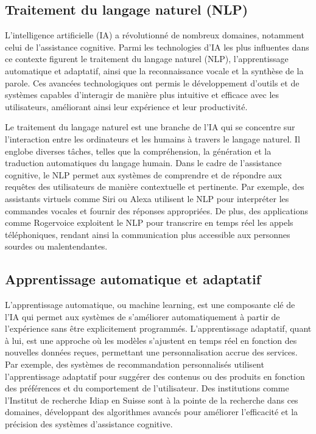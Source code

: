 \documentclass[12pt,a4paper]{report}
\begin{document}
\subsection{Traitement du langage naturel (NLP)}

L'intelligence artificielle (IA) a révolutionné de nombreux domaines, notamment celui de l'assistance cognitive. Parmi les technologies d'IA les plus influentes dans ce contexte figurent le traitement du langage naturel (NLP), l'apprentissage automatique et adaptatif, ainsi que la reconnaissance vocale et la synthèse de la parole. Ces avancées technologiques ont permis le développement d'outils et de systèmes capables d'interagir de manière plus intuitive et efficace avec les utilisateurs, améliorant ainsi leur expérience et leur productivité.

Le traitement du langage naturel est une branche de l'IA qui se concentre sur l'interaction entre les ordinateurs et les humains à travers le langage naturel. Il englobe diverses tâches, telles que la compréhension, la génération et la traduction automatiques du langage humain. Dans le cadre de l'assistance cognitive, le NLP permet aux systèmes de comprendre et de répondre aux requêtes des utilisateurs de manière contextuelle et pertinente. Par exemple, des assistants virtuels comme Siri ou Alexa utilisent le NLP pour interpréter les commandes vocales et fournir des réponses appropriées. De plus, des applications comme Rogervoice exploitent le NLP pour transcrire en temps réel les appels téléphoniques, rendant ainsi la communication plus accessible aux personnes sourdes ou malentendantes.

\subsection{Apprentissage automatique et adaptatif}

L'apprentissage automatique, ou machine learning, est une composante clé de l'IA qui permet aux systèmes de s'améliorer automatiquement à partir de l'expérience sans être explicitement programmés. L'apprentissage adaptatif, quant à lui, est une approche où les modèles s'ajustent en temps réel en fonction des nouvelles données reçues, permettant une personnalisation accrue des services. Par exemple, des systèmes de recommandation personnalisés utilisent l'apprentissage adaptatif pour suggérer des contenus ou des produits en fonction des préférences et du comportement de l'utilisateur. Des institutions comme l'Institut de recherche Idiap en Suisse sont à la pointe de la recherche dans ces domaines, développant des algorithmes avancés pour améliorer l'efficacité et la précision des systèmes d'assistance cognitive.
\end{document}
